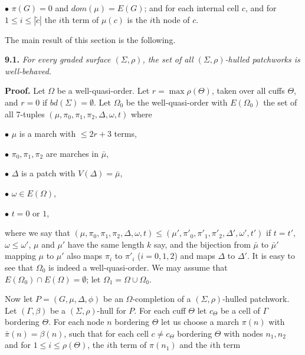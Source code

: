 \hspace*{12pt}$\bullet$ $\pi(G) = 0$ and $dom(\mu) = E(G)$; and for each internal cell $c$, and for $1 \le i \le |\tilde{c}|$ the $i$th term of $\mu(c)$ is the $i$th node of $c$.

The main result of this section is the following.

\textbf{9.1.} \textit{For every graded surface $(\Sigma, \rho)$, the set of all $(\Sigma, \rho)$-hulled patchworks is well-behaved.}

\textbf{Proof.} Let $\Omega$ be a well-quasi-order. Let $r = \max \rho(\Theta)$, taken over all cuffs $\Theta$, and $r = 0$ if $bd(\Sigma) = \emptyset$. Let $\Omega_0$ be the well-quasi-order with $E(\Omega_0)$ the set of all 7-tuples $(\mu, \pi_0, \pi_1, \pi_2, \Delta, \omega, t)$ where

\hspace*{12pt}$\bullet$ $\mu$ is a march with $\le 2r + 3$ terms,

\hspace*{12pt}$\bullet$ $\pi_0, \pi_1, \pi_2$ are marches in $\bar{\mu}$,

\hspace*{12pt}$\bullet$ $\Delta$ is a patch with $V(\Delta) = \bar{\mu}$,

\hspace*{12pt}$\bullet$ $\omega \in E(\Omega)$,

\hspace*{12pt}$\bullet$ $t = 0$ or $1$,

where we say that $(\mu, \pi_0, \pi_1, \pi_2, \Delta, \omega, t) \le (\mu', \pi'_0, \pi'_1, \pi'_2, \Delta', \omega', t')$ if $t = t'$, $\omega \le \omega'$, $\mu$ and $\mu'$ have the same length $k$ say, and the bijection from $\bar{\mu}$ to $\bar{\mu}'$ mapping $\mu$ to $\mu'$ also maps $\pi_i$ to $\pi'_i$ ($i = 0, 1, 2$) and maps $\Delta$ to $\Delta'$. It is easy to see that $\Omega_0$ is indeed a well-quasi-order. We may assume that $E(\Omega_0) \cap E(\Omega) = \emptyset$; let $\Omega_1 = \Omega \cup \Omega_0$.

Now let $P = (G, \mu, \Delta, \phi)$ be an $\Omega$-completion of a $(\Sigma, \rho)$-hulled patchwork. Let $(\Gamma, \beta)$ be a $(\Sigma, \rho)$-hull for $P$. For each cuff $\Theta$ let $c_\Theta$ be a cell of $\Gamma$ bordering $\Theta$. For each node $n$ bordering $\Theta$ let us choose a march $\pi(n)$ with $\bar{\pi}(n) = \beta(n)$, such that for each cell $c \ne c_\Theta$ bordering $\Theta$ with nodes $n_1, n_2$ and for $1 \le i \le \rho(\Theta)$, the $i$th term of $\pi(n_1)$ and the $i$th term
